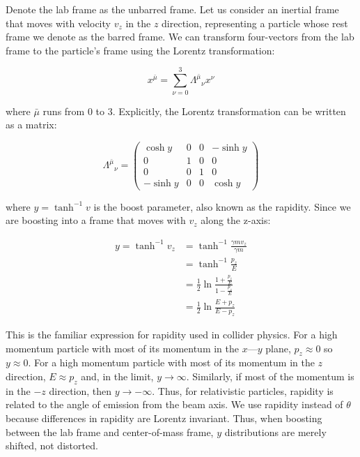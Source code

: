 \documentclass[../main.tex]{subfiles}
\begin{document}
Denote the lab frame as the unbarred frame. Let us consider an inertial frame that moves with velocity $v_z$ in the $z$ direction, representing a particle whose rest frame we denote as the barred frame. We can transform four-vectors from the lab frame to the particle's frame using the Lorentz transformation: 

\begin{equation}
    x^{\bar{\mu}} = \sum_{\nu=0}^3 \Lambda^{\bar{\mu}}{}_{\nu} x^{\nu}
\end{equation}

where $\bar{\mu}$ runs from $0$ to $3$. Explicitly, the Lorentz transformation can be written as a matrix:

\begin{equation}
    \Lambda^{\bar{\mu}}{}_{\nu} =  \begin{pmatrix} \cosh{y} & 0 & 0 & -\sinh{y} \\ 0 & 1 & 0 & 0 \\ 0 & 0 & 1 & 0 \\ -\sinh{y} & 0 & 0 & \cosh{y} \end{pmatrix}
\end{equation}

where $y=\tanh^{-1}{v}$ is the boost parameter, also known as the rapidity. Since we are boosting into a frame that moves with $v_z$ along the z-axis:

\begin{align}
    y = \tanh^{-1} v_z & = \tanh^{-1} \frac{\gamma m v_z}{\gamma m} \\
    & = \tanh^{-1} \frac{p_z}{E} \\
    & = \frac{1}{2} \ln{\frac{1 + \frac{p_z}{E}}{1 - \frac{p_z}{E}}} \\
    & = \frac{1}{2} \ln{\frac{E + p_z}{E - p_z}}
\end{align}

This is the familiar expression for rapidity used in collider physics. For a high momentum particle with most of its momentum in the $x$---$y$ plane, $p_z \approx 0$ so $y \approx 0$. For a high momentum particle with most of its momentum in the $z$ direction, $E \approx p_z$ and, in the limit, $y \rightarrow \infty$. Similarly, if most of the momentum is in the $-z$ direction, then $y \rightarrow - \infty$. Thus, for relativistic particles, rapidity is related to the angle of emission from the beam axis. We use rapidity instead of $\theta$ because differences in rapidity are Lorentz invariant. Thus, when boosting between the lab frame and center-of-mass frame, $y$ distributions are merely shifted, not distorted. 
\end{document}
